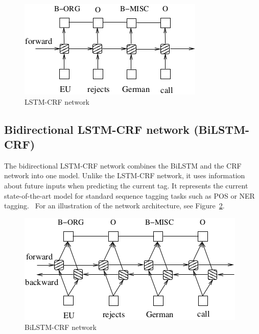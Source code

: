 \begin{figure}[htbp]
    \centering
    \includegraphics{text/images/lstm_crf.png}
    \caption{LSTM-CRF network~\cite{BiLSTMCRF}}\label{img:lstm-crf}
\end{figure}

\subsection{Bidirectional LSTM-CRF network (Bi\-LSTM-CRF)}
The bidirectional LSTM-CRF network combines the BiLSTM and the CRF network into one model. Unlike the LSTM-CRF network, it uses information about future inputs when predicting the current tag. It represents the current state-of-the-art model for standard sequence tagging tasks such as POS or NER tagging.~\cite{BiLSTMCRF} For an illustration of the network architecture, see Figure~\ref{img:bi-lstm-crf}.

\begin{figure}[htbp]
    \centering
    \includegraphics{text/images/bilstm_crf.png}
    \caption{BiLSTM-CRF network~\cite{BiLSTMCRF}}\label{img:bi-lstm-crf}
\end{figure}

